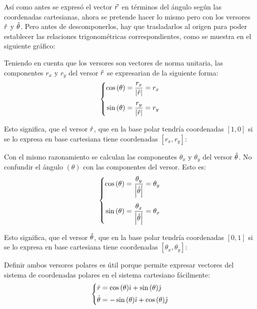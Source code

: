\documentclass[a5paper,12pt,twoside]{book}
\begin{document}
Así como antes se expresó el vector $\vec{r}\hspace{0.05cm}$ en términos del ángulo según las coordenadas cartesianas, ahora se pretende hacer lo mismo pero con los versores $\hat{r}$ y $\hat{\theta}$.
Pero antes de descomponerlos, hay que trasladarlos al origen para poder establecer las relaciones trigonométricas correspondientes, como se muestra en el siguiente gráfico:

\begin{center}
    \def\svgwidth{0.5\linewidth}
    
\end{center}

Teniendo en cuenta que los versores son vectores de norma unitaria, las componentes $r_x$ y $r_y$ del versor $\hat{r}$ se expresarian de la siguiente forma:
\[
  \left\{
    \begin{aligned}
      \cos{(\theta)} &= \dfrac{r_x}{{\left| {\hat{r}} \right|}} = r_x
      \\[1ex]
      \sin{(\theta)} &= \dfrac{r_y}{{\left| {\hat{r}} \right|}} = r_y
    \end{aligned}
  \right.
\]

Esto significa, que el versor $\hat{r}$, que en la base polar tendría coordenadas $[1,0]$ si se lo expresa en base cartesiana tiene coordenadas $[r_x,r_y]$:

Con el mismo razonamiento se calculan las componentes $\theta_x$ y $\theta_y$ del versor $\hat{\theta}$.
No confundir el ángulo $(\theta)$ con las componentes del versor.
Esto es:
\[
\left\{
  \begin{aligned}
    \cos{(\theta)} &= \dfrac{\theta_y}{{\left| {\hat{\theta}} \right|}} = \theta_y
    \\[1ex]
    \sin{(\theta)} &= \dfrac{\theta_x}{{\left| {\hat{\theta}} \right|}} = \theta_x
  \end{aligned}
\right.
\]

Esto significa, que el versor $\hat{\theta}$, que en la base polar tendría coordenadas $[0,1]$ si se lo expresa en base cartesiana tiene coordenadas $[\theta_x,\theta_y]$:

Definir ambos versores polares es útil porque permite expresar vectores del sistema de coordenadas polares en el sistema cartesiano fácilmente:
\[
  \left\{
    \begin{aligned}
      \hat{r} &= \cos{(\theta)} \hat{\imath} + \sin{(\theta)} \hat{\jmath}
      \\
      \hat{\theta} &= -\sin{(\theta)} \hat{\imath} + \cos{(\theta)} \hat{\jmath}
    \end{aligned}
  \right.
\]
\end{document}
